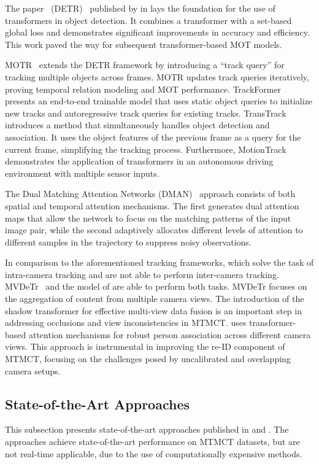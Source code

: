 The paper ~(DETR)~\cite{Carion20} published by \citeauthor{Carion20} in \citeyear{Carion20} lays the foundation for the use of transformers in object detection. It combines a transformer with a set-based global loss and demonstrates significant improvements in accuracy and efficiency. This work paved the way for subsequent transformer-based MOT models.

MOTR~\cite{Zeng21} extends the DETR framework by introducing a ``track query'' for tracking multiple objects across frames. MOTR updates track queries iteratively, proving temporal relation modeling and MOT performance. TrackFormer~\cite{Meinhardt22} presents an end-to-end trainable model that uses static object queries to initialize new tracks and autoregressive track queries for existing tracks. TransTrack~\cite{Sun20} introduces a method that simultaneously handles object detection and association. It uses the object features of the previous frame as a query for the current frame, simplifying the tracking process. Furthermore, MotionTrack~\cite{Zhang23} demonstrates the application of transformers in an autonomous driving environment with multiple sensor inputs.

The Dual Matching Attention Networks (DMAN)~\cite{Zhu19} approach consists of both spatial and temporal attention mechanisms. The first generates dual attention maps that allow the network to focus on the matching patterns of the input image pair, while the second adaptively allocates different levels of attention to different samples in the trajectory to suppress noisy observations.

In comparison to the aforementioned tracking frameworks, which solve the task of intra-camera tracking and are not able to perform inter-camera tracking. MVDeTr~\cite{Hou21} and the model of \textcite{Li21} are able to perform both tasks. MVDeTr focuses on the aggregation of content from multiple camera views. The introduction of the shadow transformer for effective multi-view data fusion is an important step in addressing occlusions and view inconsistencies in MTMCT. \cite{Li21} uses transformer-based attention mechanisms for robust person association across different camera views. This approach is instrumental in improving the re-ID component of MTMCT, focusing on the challenges posed by uncalibrated and overlapping camera setups.

\subsection{State-of-the-Art Approaches}\label{subsec:state-of-the-art_approaches}
This subsection presents state-of-the-art approaches published in \citeyear{Hsu22} and \citeyear{Teepe23}. The approaches achieve state-of-the-art performance on MTMCT datasets, but are not real-time applicable, due to the use of computationally expensive methods.


